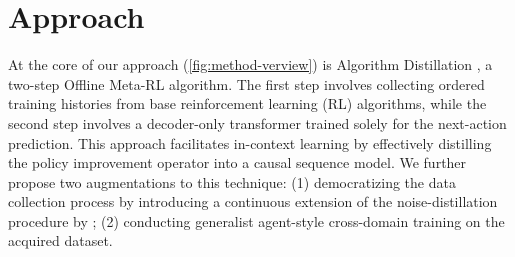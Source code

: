 \documentclass{article}
\theoremstyle{plain}
\theoremstyle{definition}
\theoremstyle{remark}
\begin{document}
\section{Approach}
At the core of our approach (\cref{fig:method-verview}) is Algorithm Distillation \cite{laskin2022incontextreinforcementlearningalgorithm}, a two-step Offline Meta-RL algorithm. The first step involves collecting ordered training histories from base reinforcement learning (RL) algorithms, while the second step involves a decoder-only transformer trained solely for the next-action prediction. This approach facilitates in-context learning by effectively distilling the policy improvement operator into a causal sequence model. We further propose two augmentations to this technique: (1) democratizing the data collection process by introducing a continuous extension of the noise-distillation procedure by \citet{zisman2024emergenceincontextreinforcementlearning}; (2) conducting generalist agent-style cross-domain training on the acquired dataset.
\end{document}
